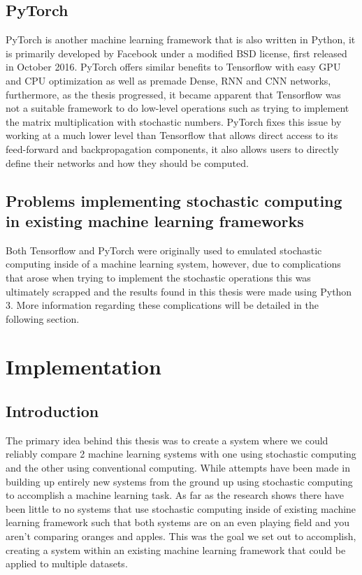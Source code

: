 \documentclass[a4paper,oneside,phd,etd]{BYUPhys}
\begin{document}
\section{PyTorch}
PyTorch\cite{pytorch} is another machine learning framework that is also written in Python, it is primarily developed by Facebook under a modified BSD license, first released in October 2016. PyTorch offers similar benefits to Tensorflow with easy GPU and CPU optimization as well as premade Dense, RNN and CNN networks, furthermore, as the thesis progressed, it became apparent that Tensorflow was not a suitable framework to do low-level operations such as trying to implement the matrix multiplication with stochastic numbers. PyTorch fixes this issue by working at a much lower level than Tensorflow that allows direct access to its feed-forward and backpropagation components, it also allows users to directly define their networks and how they should be computed.

\section{Problems implementing stochastic computing in existing machine learning frameworks}
Both Tensorflow and PyTorch were originally used to emulated stochastic computing inside of a machine learning system, however, due to complications that arose when trying to implement the stochastic operations this was ultimately scrapped and the results found in this thesis were made using Python 3. More information regarding these complications will be detailed in the following section.

\chapter{Implementation}
\section{Introduction}
The primary idea behind this thesis was to create a system where we could reliably compare 2 machine learning systems with one using stochastic computing and the other using conventional computing. While attempts have been made in building up entirely new systems from the ground up using stochastic computing to accomplish a machine learning task\cite{hirtzlin2019stochastic}. As far as the research shows there have been little to no systems that use stochastic computing inside of existing machine learning framework such that both systems are on an even playing field and you aren't comparing oranges and apples. This was the goal we set out to accomplish, creating a system within an existing machine learning framework that could be applied to multiple datasets.
\end{document}
